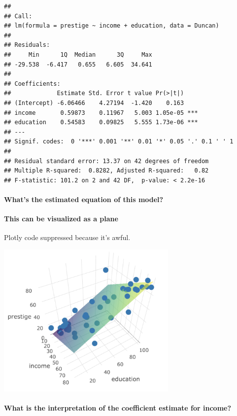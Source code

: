 \documentclass[]{extarticle}
\let\oldparagraph\paragraph
\renewcommand{\paragraph}[1]{\oldparagraph{#1}\mbox{}}
\begin{document}
\begin{verbatim}
## 
## Call:
## lm(formula = prestige ~ income + education, data = Duncan)
## 
## Residuals:
##     Min      1Q  Median      3Q     Max 
## -29.538  -6.417   0.655   6.605  34.641 
## 
## Coefficients:
##             Estimate Std. Error t value Pr(>|t|)    
## (Intercept) -6.06466    4.27194  -1.420    0.163    
## income       0.59873    0.11967   5.003 1.05e-05 ***
## education    0.54583    0.09825   5.555 1.73e-06 ***
## ---
## Signif. codes:  0 '***' 0.001 '**' 0.01 '*' 0.05 '.' 0.1 ' ' 1
## 
## Residual standard error: 13.37 on 42 degrees of freedom
## Multiple R-squared:  0.8282, Adjusted R-squared:   0.82 
## F-statistic: 101.2 on 2 and 42 DF,  p-value: < 2.2e-16
\end{verbatim}

\paragraph{What's the estimated equation of this
model?}\label{whats-the-estimated-equation-of-this-model}

\vspace{3cm}

\paragraph{This can be visualized as a
plane}\label{this-can-be-visualized-as-a-plane}

Plotly code suppressed because it's awful.

\includegraphics[height=3in]{plotly_ss_1plane.png}

\paragraph{What is the interpretation of the coefficient estimate for
income?}\label{what-is-the-interpretation-of-the-coefficient-estimate-for-income-1}
\end{document}
